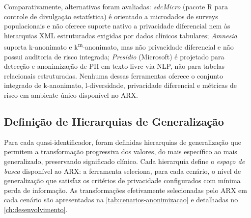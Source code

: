 Comparativamente, alternativas foram avaliadas: \textit{sdcMicro} \cite{Templ2015} (pacote R para controle de divulgação estatística) é orientado a microdados de surveys populacionais e não oferece suporte nativo a privacidade diferencial nem às hierarquias XML estruturadas exigidas por dados clínicos tabulares; \textit{Amnesia} suporta k-anonimato e k\textsuperscript{m}-anonimato, mas não privacidade diferencial e não possui auditoria de risco integrada; \textit{Presidio} (Microsoft) é projetado para detecção e anonimização de PII em texto livre via NLP, não para tabelas relacionais estruturadas. Nenhuma dessas ferramentas oferece o conjunto integrado de k-anonimato, l-diversidade, privacidade diferencial e métricas de risco em ambiente único disponível no ARX.


\subsection{Definição de Hierarquias de Generalização}

Para cada quasi-identificador, foram definidas hierarquias de generalização que permitem a transformação progressiva dos valores, do mais específico ao mais generalizado, preservando significado clínico. Cada hierarquia define o \textit{espaço de busca} disponível ao ARX: a ferramenta seleciona, para cada cenário, o nível de generalização que satisfaz os critérios de privacidade configurados com mínima perda de informação. As transformações efetivamente selecionadas pelo ARX em cada cenário são apresentadas na \autoref{tab:cenarios-anonimizacao} e detalhadas no \autoref{ch:desenvolvimento}.

